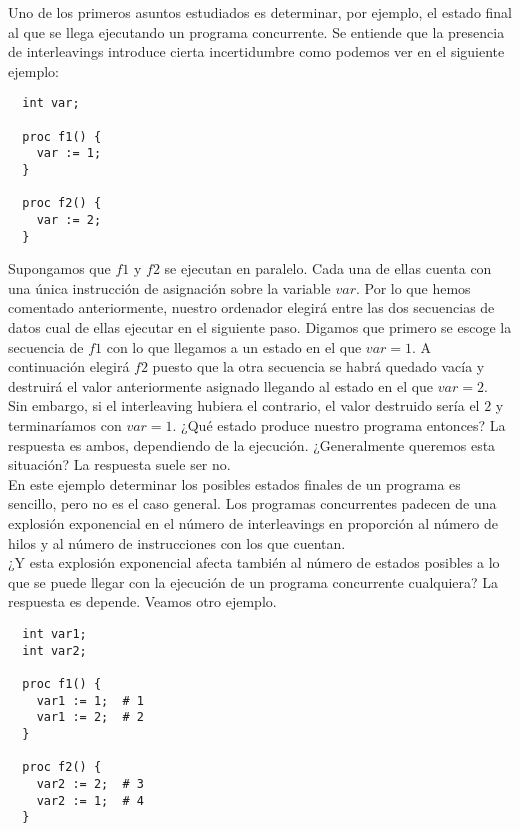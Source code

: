 Uno de los primeros asuntos estudiados es determinar, por ejemplo, el estado final al que se llega ejecutando un programa concurrente. Se entiende que la presencia de interleavings introduce cierta incertidumbre como podemos ver en el siguiente ejemplo:

\begin{lstlisting}
  int var;

  proc f1() {
    var := 1;
  }

  proc f2() {
    var := 2;
  }
\end{lstlisting}

Supongamos que $f1$ y $f2$ se ejecutan en paralelo. Cada una de ellas cuenta con una única instrucción de asignación sobre la variable $var$. Por lo que hemos comentado anteriormente, nuestro ordenador elegirá entre las dos secuencias de datos cual de ellas ejecutar en el siguiente paso. Digamos que primero se escoge la secuencia de $f1$ con lo que llegamos a un estado en el que $var = 1$. A continuación elegirá $f2$ puesto que la otra secuencia se habrá quedado vacía y destruirá el valor anteriormente asignado llegando al estado en el que $var = 2$.\\

Sin embargo, si el interleaving hubiera el contrario, el valor destruido sería el $2$ y terminaríamos con $var = 1$. ¿Qué estado produce nuestro programa entonces? La respuesta es ambos, dependiendo de la ejecución. ¿Generalmente queremos esta situación? La respuesta suele ser no.\\

En este ejemplo determinar los posibles estados finales de un programa es sencillo, pero no es el caso general. Los programas concurrentes padecen de una explosión exponencial en el número de interleavings en proporción al número de hilos y al número de instrucciones con los que cuentan.\\

¿Y esta explosión exponencial afecta también al número de estados posibles a lo que se puede llegar con la ejecución de un programa concurrente cualquiera? La respuesta es depende. Veamos otro ejemplo.

\begin{lstlisting}
  int var1;
  int var2;

  proc f1() {
    var1 := 1;  # 1
    var1 := 2;  # 2
  }

  proc f2() {
    var2 := 2;  # 3
    var2 := 1;  # 4
  }
\end{lstlisting}

